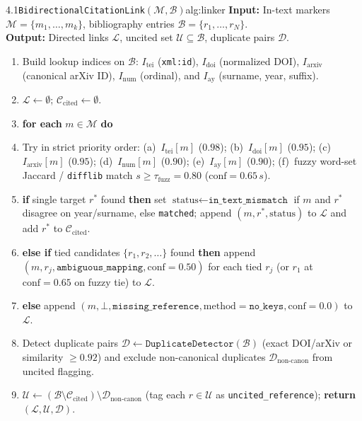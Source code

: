 \begin{citraalgo}{4.1}{\texttt{BidirectionalCitationLink}$(\mathcal{M}, \mathcal{B})$}{alg:linker}
\textbf{Input:} In-text markers $\mathcal{M} = \{m_1, \dots, m_k\}$, bibliography entries $\mathcal{B} = \{r_1, \dots, r_N\}$.\\
\textbf{Output:} Directed links $\mathcal{L}$, uncited set $\mathcal{U} \subseteq \mathcal{B}$, duplicate pairs $\mathcal{D}$.
{\setlength{\leftmargini}{1.6em}
\begin{enumerate}\setlength{\itemsep}{1pt}\setlength{\parskip}{0pt}
\item Build lookup indices on $\mathcal{B}$: $I_{\text{tei}}$ (\texttt{xml:id}), $I_{\text{doi}}$ (normalized DOI), $I_{\text{arxiv}}$ (canonical arXiv ID), $I_{\text{num}}$ (ordinal), and $I_{\text{ay}}$ (surname, year, suffix).
\item $\mathcal{L} \leftarrow \emptyset$; $\mathcal{C}_{\text{cited}} \leftarrow \emptyset$.
\item \textbf{for each} $m \in \mathcal{M}$ \textbf{do}
\item \quad Try in strict priority order: (a)~$I_{\text{tei}}[m]$ ($0.98$); (b)~$I_{\text{doi}}[m]$ ($0.95$); (c)~$I_{\text{arxiv}}[m]$ ($0.95$); (d)~$I_{\text{num}}[m]$ ($0.90$); (e)~$I_{\text{ay}}[m]$ ($0.90$); (f)~fuzzy word-set Jaccard / \texttt{difflib} match $s \ge \tau_{\text{fuzz}} = 0.80$ ($\text{conf} = 0.65\,s$).
\item \quad \textbf{if} single target $r^*$ found \textbf{then} set $\text{status} \leftarrow \texttt{in\_text\_mismatch}$ if $m$ and $r^*$ disagree on year/surname, else \texttt{matched}; append $(m, r^*, \text{status})$ to $\mathcal{L}$ and add $r^*$ to $\mathcal{C}_{\text{cited}}$.
\item \quad \textbf{else if} tied candidates $\{r_1, r_2, \dots\}$ found \textbf{then} append $(m, r_j, \texttt{ambiguous\_mapping}, \text{conf}=0.50)$ for each tied $r_j$ (or $r_1$ at $\text{conf}=0.65$ on fuzzy tie) to $\mathcal{L}$.
\item \quad \textbf{else} append $(m, \bot, \texttt{missing\_reference}, \text{method}=\texttt{no\_keys}, \text{conf}=0.0)$ to $\mathcal{L}$.
\item Detect duplicate pairs $\mathcal{D} \leftarrow \texttt{DuplicateDetector}(\mathcal{B})$ (exact DOI/arXiv or similarity $\ge 0.92$) and exclude non-canonical duplicates $\mathcal{D}_{\text{non-canon}}$ from uncited flagging.
\item $\mathcal{U} \leftarrow (\mathcal{B} \setminus \mathcal{C}_{\text{cited}}) \setminus \mathcal{D}_{\text{non-canon}}$ (tag each $r \in \mathcal{U}$ as \texttt{uncited\_reference}); \textbf{return} $(\mathcal{L}, \mathcal{U}, \mathcal{D})$.
\end{enumerate}}
\end{citraalgo}

